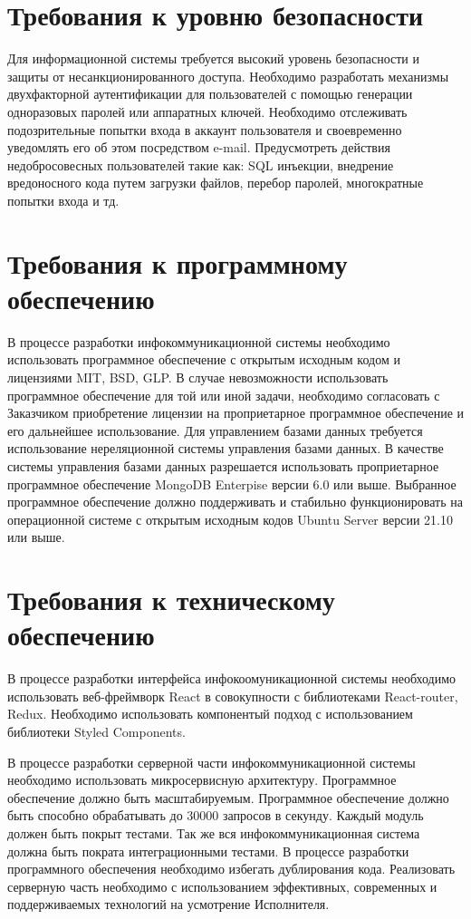 \documentclass[14pt]{extreport}
\begin{document}
        \section{Требования к уровню безопасности}
            
            Для информационной системы требуется высокий уровень безопасности и защиты от несанкционированного доступа. Необходимо разработать механизмы двухфакторной аутентификации для пользователей с помощью генерации одноразовых паролей или аппаратных ключей. Необходимо отслеживать подозрительные попытки входа в аккаунт пользователя и своевременно уведомлять его об этом посредством e-mail. Предусмотреть действия недобросовесных пользователей такие как: SQL инъекции, внедрение вредоносного кода путем загрузки файлов, перебор паролей, многократные попытки входа и тд. 

        \section{Требования к программному обеспечению}

            В процессе разработки инфокоммуникационной системы необходимо использовать программное обеспечение с открытым исходным кодом и лицензиями MIT, BSD, GLP. В случае невозможности использовать программное обеспечение для той или иной задачи, необходимо согласовать с Заказчиком приобретение лицензии на проприетарное программное обеспечение и его дальнейшее использование. Для управлением базами данных требуется использование нереляционной системы управления базами данных. В качестве системы управления базами данных разрешается использовать проприетарное программное обеспечение MongoDB Enterpise версии 6.0 или выше. Выбранное программное обеспечение должно поддерживать и стабильно функционировать на операционной системе с открытым исходным кодов Ubuntu Server версии 21.10 или выше.  
        \section{Требования к техническому обеспечению}

            В процессе разработки интерфейса инфокоомуникационной системы необходимо использовать веб-фреймворк React в совокупности с библиотеками React-router, Redux. Необходимо использовать компонентый подход с использованием библиотеки Styled Components. 

            В процессе разработки серверной части инфокоммуникационной системы необходимо использовать микросервисную архитектуру. Программное обеспечение должно быть масштабируемым. Программное обеспечение должно быть способно обрабатывать до 30000 запросов в секунду. Каждый модуль должен быть покрыт тестами. Так же вся инфокоммуникационная система должна быть пократа интеграционными тестами. В процессе разработки программного обеспечения необходимо избегать дублирования кода. Реализовать серверную часть необходимо с использованием эффективных, современных и поддерживаемых технологий на усмотрение Исполнителя. 
\end{document}
